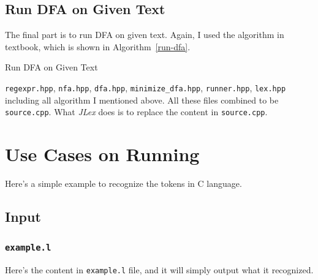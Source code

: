 \documentclass{article}
\begin{document}
\subsection{Run DFA on Given Text}

The final part is to run DFA on given text. Again, I used the algorithm in textbook, which is shown in Algorithm~\ref{run-dfa}.

\begin{algorithm}
    \caption{Run DFA on Given Text}
    \label{run-dfa}
    \Return{\True}
\end{algorithm}

\texttt{regexpr.hpp}, \texttt{nfa.hpp}, \texttt{dfa.hpp}, \texttt{minimize\_dfa.hpp}, \texttt{runner.hpp}, \texttt{lex.hpp} including all algorithm I mentioned above. All these files combined to be \texttt{source.cpp}. What \textit{JLex} does is to replace the content in \texttt{source.cpp}.

\section{Use Cases on Running}

Here's a simple example to recognize the tokens in C language.

\subsection{Input}

\subsubsection{\texttt{example.l}}
Here's the content in \texttt{example.l} file, and it will simply output what it recognized.
\end{document}
